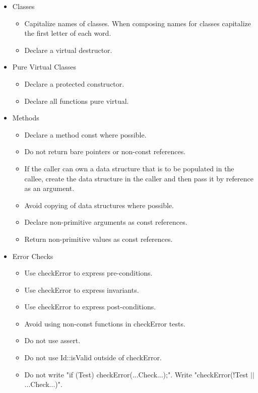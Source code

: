 \documentclass[10pt, letterpaper, twoside]{article}
\begin{document}
\begin{itemize}
\item[] Classes
 \begin{itemize}
  \item	Capitalize names of classes.  When composing names for classes capitalize the first letter of each word.
  \item	Declare a virtual destructor.
 \end{itemize}

\item[] Pure Virtual Classes
 \begin{itemize}
  \item	Declare a protected constructor.
  \item	Declare all functions pure virtual.
 \end{itemize}

\item[] Methods
 \begin{itemize}
  \item	Declare a method const where possible.
  \item	Do not return bare pointers or non-const references.
  \item	If the caller can own a data structure that is to be populated in the callee, create the data structure in the caller and then pass it by reference as an argument.
  \item	Avoid copying of data structures where possible.
  \item	Declare non-primitive arguments as const references.
  \item	Return non-primitive values as const references.
 \end{itemize}

\item[] Error Checks
 \begin{itemize}
  \item	Use checkError to express pre-conditions.
  \item	Use checkError to express invariants.
  \item	Use checkError to express post-conditions.
  \item	Avoid using non-const functions in checkError tests.
  \item	Do not use assert.
  \item	Do not use Id::isValid outside of checkError.
  \item	Do not write "if (Test) checkError(...Check...);".  Write "checkError(!Test $||$ ...Check...)".
 \end{itemize}


\end{itemize}
\end{document}

